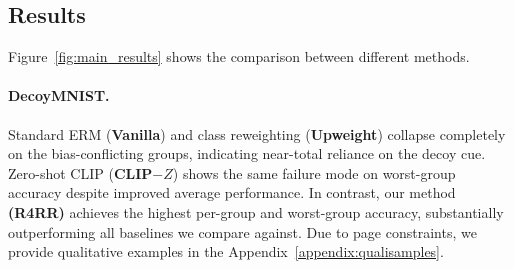 \subsection{Results}\label{sec:results}

Figure~\ref{fig:main_results} shows the comparison between different methods.

\paragraph{DecoyMNIST.} Standard ERM (\textbf{Vanilla}) and class reweighting (\textbf{Upweight}) collapse completely on the bias-conflicting groups, indicating near-total reliance on the decoy cue. Zero-shot CLIP (\textbf{CLIP$-{Z}$}) shows the same failure mode on worst-group accuracy despite improved average performance. In contrast, our method \textbf{(R4RR)} achieves the highest per-group and worst-group accuracy, substantially outperforming all baselines we compare against. Due to page constraints, we provide qualitative examples in the Appendix~\ref{appendix:qualisamples}.


